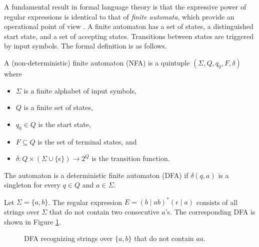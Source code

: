 A fundamental result in formal language theory is that the expressive power of regular expressions is identical to that of \textit{finite automata}, which provide an operational point of view \cite{sipser2012introduction}. A finite automaton has a set of states, a distinguished start state, and a set of accepting states. Transitions between states are triggered by input symbols. The formal definition is as follows.

\begin{definition}
  A (non-deterministic) finite automaton (NFA) is a quintuple $(\Sigma, Q, q_0, F, \delta)$ where
  \begin{itemize}
    \item $\Sigma$ is a finite alphabet of input symbols,
    \item $Q$ is a finite set of states,
    \item $q_0 \in Q$ is the start state,
    \item $F \subseteq Q$ is the set of terminal states, and
    \item $\delta: Q \times (\Sigma\cup \{\epsilon\}) \to 2^Q$ is the transition function.
  \end{itemize}

  The automaton is a deterministic finite automaton (DFA) if $\delta(q,a)$ is a singleton for every $q\in Q$ and $a\in\Sigma$.
\end{definition}

\begin{example}
  Let $\Sigma = \{a,b\}$. The regular expression $E = (b \mid ab)^*(\epsilon \mid a)$ consists of all strings over $\Sigma$ that do not contain two consecutive $a$'s. The corresponding DFA is shown in Figure \ref{fig:dfa_no_aa}.
\end{example}

\begin{figure}[htbp]
  \centering
  \caption{DFA recognizing strings over $\{a,b\}$ that do not contain $aa$.}
  \label{fig:dfa_no_aa}
\end{figure}

